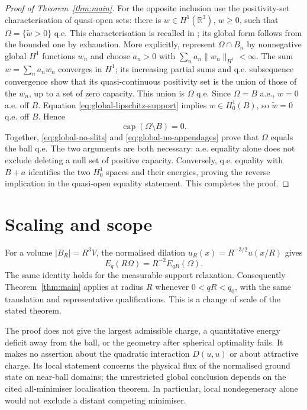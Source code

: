 \documentclass[11pt,a4paper]{article}
\theoremstyle{definition}
\theoremstyle{remark}
\begin{document}
\begin{proof}[Proof of Theorem~\ref{thm:main}]
For the opposite inclusion use the positivity-set characterisation of
quasi-open sets: there is $w\in H^1(\mathbb R^3)$, $w\geq0$, such
that $\Omega=\{\widetilde w>0\}$ q.e.
This characterisation is recalled in
\cite[Section~2.3]{MMR2025}; its global form follows from the bounded
one by exhaustion.  More explicitly, represent
$\Omega\cap B_n$ by nonnegative global $H^1$ functions $w_n$ and
choose $a_n>0$ with
$\sum_n a_n\|w_n\|_{H^1}<\infty$.  The sum
$w=\sum_n a_nw_n$ converges in $H^1$; its increasing partial sums and
q.e. subsequence convergence show that its quasi-continuous positivity
set is the union of those of the $w_n$, up to a set of zero capacity.
This union is $\Omega$ q.e.
Since $\Omega=B$ a.e., $w=0$ a.e. off $B$.
Equation \eqref{eq:global-lipschitz-support} implies $w\in H^1_0(B)$,
so $\widetilde w=0$ q.e. off $B$.  Hence
\begin{equation}
 \operatorname{cap}(\Omega\setminus B)=0.
 \label{eq:global-no-appendages}
\end{equation}
Together, \eqref{eq:global-no-slits} and
\eqref{eq:global-no-appendages} prove that $\Omega$ equals the ball
q.e.  The two arguments are both necessary: a.e. equality alone does
not exclude deleting a null set of positive capacity.
Conversely, q.e. equality with $B+a$ identifies the two
$H^1_0$ spaces and their energies, proving the reverse implication in
the quasi-open equality statement.  This completes the proof.
\end{proof}

\section{Scaling and scope}\label{sec:scope}
For a volume $|B_R|=R^3V$, the normalised dilation $u_R(x)=R^{-3/2}u(x/R)$ gives
\[
 E_q(R\Omega)=R^{-2}E_{qR}(\Omega).
\]
The same identity holds for the measurable-support relaxation. Consequently Theorem~\ref{thm:main} applies at radius $R$ whenever $0<qR<q_0$, with the same translation and representative qualifications. This is a change of scale of the stated theorem.

The proof does not give the largest admissible charge, a quantitative energy deficit away from the ball, or the geometry after spherical optimality fails. It makes no assertion about the quadratic interaction $D(u,u)$ or about attractive charge. Its local statement concerns the physical flux of the normalised ground state on near-ball domains; the unrestricted global conclusion depends on the cited all-minimiser localisation theorem. In particular, local nondegeneracy alone would not exclude a distant competing minimiser.
\end{document}
